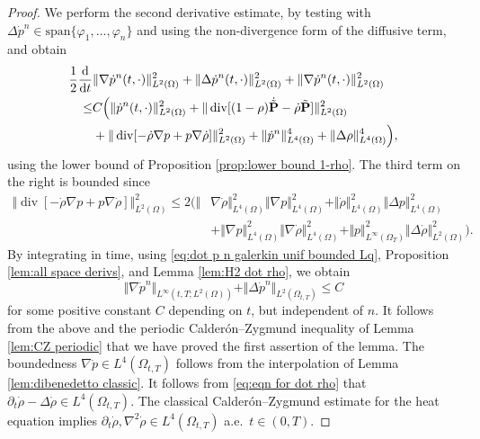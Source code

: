 \documentclass[11pt,a4paper,reqno]{amsart}
\theoremstyle{remark}
\theoremstyle{definition}
\numberwithin{equation}{section}
\DeclareMathOperator{\dv}{div}
\renewcommand{\span}{\mathrm{span}}
\renewcommand{\P}{{\bf P}}
\newcommand{\der}{\mathrm{d}}
\begin{document}
\begin{proof}
We perform the second derivative estimate, by testing with $\Delta \dot{p}^n \in \span\{\varphi_1,\dots,\varphi_n\}$ and using the non-divergence form of the diffusive term, and obtain 
\begin{equation*}
   \begin{aligned} 
        \frac{1}{2}\frac{\der}{\der t}
        &
        \Vert\nabla \dot{p}^n(t,\cdot)\Vert_{L^2(\Omega)}^2 
        + \Vert \Delta \dot{p}^n(t,\cdot) \Vert_{L^2(\Omega)}^2 +\Vert \nabla \dot{p}^n(t,\cdot) \Vert_{L^2(\Omega)}^2 \\ 
        \leq &
        C \Big( \Vert \dot{p}^n(t,\cdot) \Vert_{L^2(\Omega)}^2 + \Vert \dv[ (1-\rho)\dot{\tilde{\P}} - \dot{\rho} \tilde{\P} ]\Vert^2_{L^2(\Omega)} 
        \\  &
        + \Vert \dv [ - \dot{\rho} \nabla p + p \nabla \dot{\rho}   ]\Vert^2_{L^2(\Omega)} 
        + \Vert \dot{p}^n \Vert_{L^4(\Omega)}^4 + \Vert \Delta \rho \Vert^4_{L^4(\Omega)} \Big), 
   \end{aligned}
\end{equation*}
using the lower bound of Proposition \ref{prop:lower bound 1-rho}. The third term on the right is bounded since 
\begin{equation*}
    \begin{aligned}
        \Vert \dv [ - \dot{\rho} \nabla p + p \nabla \dot{\rho}   ]\Vert^2_{L^2(\Omega)} \leq 2 \Big( \Vert & \nabla \dot{\rho} \Vert^2_{L^4(\Omega)} \Vert \nabla p \Vert^2_{L^4(\Omega)} + \Vert \dot{\rho} \Vert^2_{L^4(\Omega)} \Vert \Delta p \Vert^2_{L^4(\Omega)} \\ 
        &+ \Vert \nabla p \Vert^2_{L^4(\Omega)}\Vert \nabla \dot{\rho} \Vert^2_{L^4(\Omega)} + \Vert p \Vert^2_{L^\infty(\Omega_T)}\Vert \Delta \dot{\rho} \Vert^2_{L^2(\Omega)} \Big). 
    \end{aligned}
\end{equation*}
By integrating in time, using \eqref{eq:dot p n galerkin unif bounded Lq}, Proposition \ref{lem:all space derivs}, and Lemma \ref{lem:H2 dot rho}, we obtain 
\begin{equation*}
    \Vert \nabla \dot{p}^n \Vert_{L^\infty(t,T;L^2(\Omega))} + \Vert \Delta \dot{p}^n \Vert_{L^2(\Omega_{t,T})} \leq C 
\end{equation*}
for some positive constant $C$ depending on $t$, but independent of $n$. It follows from the above and the periodic Calder\'on--Zygmund inequality of Lemma \ref{lem:CZ periodic} that we have proved the first assertion of the lemma. The boundedness  $\nabla \dot{p} \in L^4(\Omega_{t,T})$ follows from the interpolation  of Lemma \ref{lem:dibenedetto classic}. It follows from \eqref{eq:eqn for dot rho} that $\partial_t \dot{\rho} - \Delta \dot{\rho} \in L^4(\Omega_{t,T})$. The classical Calder\'on--Zygmund estimate for the heat equation implies $\partial_t \dot{\rho},\nabla^2 \dot{\rho} \in L^4(\Omega_{t,T})$  a.e.~$t \in (0,T)$. 


\end{proof}
\end{document}
